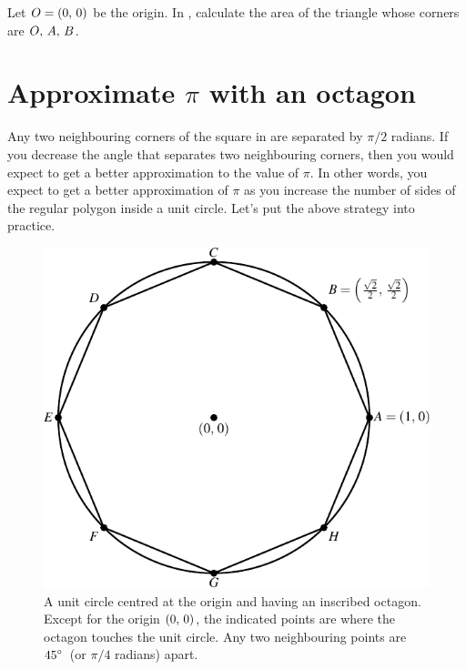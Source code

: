 \documentclass[a4paper,oneside,12pt]{article}
\begin{document}
\begin{exercise}
Let $O = \left\lparen{0},\, {0}\right\rparen$ be the origin.  In
, calculate the area of the
triangle whose corners are ${O},\, {A},\, {B}$.
\end{exercise}




\section{Approximate $\pi$ with an octagon}
\label{sec:approximate_pi_with_an_octagon}

Any two neighbouring corners of the square in
 are separated by $\pi / 2$
radians.  If you decrease the angle that separates two neighbouring
corners, then you would expect to get a better approximation to the
value of $\pi$.  In other words, you expect to get a better
approximation of $\pi$ as you increase the number of sides of the
regular polygon inside a unit circle.  Let's put the above strategy
into practice.

\begin{figure}[!htbp]
\centering
\includegraphics[scale=1]{image/05/circle-octagon.pdf}
\caption{%
  A unit circle centred at the origin and having an inscribed
  octagon.  Except for the origin $\left\lparen{0},\, {0}\right\rparen$, the indicated points
  are where the octagon touches the unit circle.  Any two neighbouring
  points are ${45}^{\circ}$~(or $\pi / 4$ radians) apart.
}
\label{fig:circle_inscribed_octagon}
\end{figure}
\end{document}
